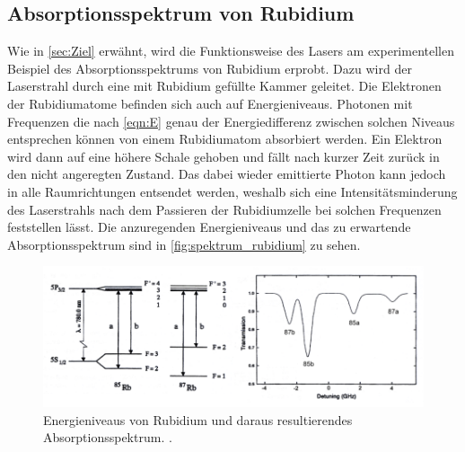 \subsection{Absorptionsspektrum von Rubidium}
Wie in \autoref{sec:Ziel} erwähnt, wird die Funktionsweise des Lasers am experimentellen Beispiel des Absorptionsspektrums von Rubidium erprobt. 
Dazu wird der Laserstrahl durch eine mit Rubidium gefüllte Kammer geleitet. Die Elektronen der Rubidiumatome befinden sich auch auf Energieniveaus.
Photonen mit Frequenzen die nach \autoref{eqn:E} genau der Energiedifferenz zwischen solchen Niveaus entsprechen können von einem Rubidiumatom absorbiert werden.
Ein Elektron wird dann auf eine höhere Schale gehoben und fällt nach kurzer Zeit zurück in den nicht angeregten Zustand. Das dabei wieder emittierte Photon kann jedoch
in alle Raumrichtungen entsendet werden, weshalb sich eine Intensitätsminderung des Laserstrahls nach dem Passieren der Rubidiumzelle bei solchen Frequenzen feststellen lässt. 
Die anzuregenden Energieniveaus und das zu erwartende Absorptionsspektrum sind in \autoref{fig:spektrum_rubidium} zu sehen.

\begin{figure}
    \centering
    \includegraphics[scale=0.55]{content/pics/spektrum_rubidium.png}
    \caption{Energieniveaus von Rubidium und daraus resultierendes Absorptionsspektrum. \cite{diode_laser_spectroscopy}.}
    \label{fig:spektrum_rubidium}
\end{figure}
